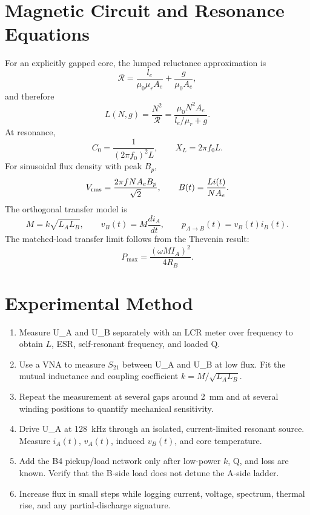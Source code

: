 \documentclass[11pt]{article}
\begin{document}
\section{Magnetic Circuit and Resonance Equations}
For an explicitly gapped core, the lumped reluctance approximation is
\begin{equation}
\mathcal{R} =
\frac{l_e}{\mu_0\mu_r A_e}+\frac{g}{\mu_0 A_e},
\end{equation}
and therefore
\begin{equation}
L(N,g)=\frac{N^2}{\mathcal{R}}
= \frac{\mu_0N^2A_e}{l_e/\mu_r+g}.
\end{equation}
At resonance,
\begin{equation}
C_0 = \frac{1}{(2\pi f_0)^2L},\qquad X_L=2\pi f_0L.
\end{equation}
For sinusoidal flux density with peak \(B_p\),
\begin{equation}
V_{\rm rms} = \frac{2\pi f N A_e B_p}{\sqrt{2}},
\qquad
B(t)=\frac{L i(t)}{N A_e}.
\end{equation}
The orthogonal transfer model is
\begin{equation}
M=k\sqrt{L_A L_B},
\qquad
v_B(t)=M\frac{di_A}{dt},
\qquad
p_{A\rightarrow B}(t)=v_B(t)i_B(t).
\end{equation}
The matched-load transfer limit follows from the Thevenin result:
\begin{equation}
P_{\max} = \frac{(\omega M I_A)^2}{4R_B}.
\end{equation}

\section{Experimental Method}
\begin{enumerate}
\item Measure U\_A and U\_B separately with an LCR meter over frequency to
obtain \(L\), ESR, self-resonant frequency, and loaded Q.
\item Use a VNA to measure \(S_21\) between U\_A and U\_B at low flux.  Fit
the mutual inductance and coupling coefficient \(k=M/\sqrt{L_AL_B}\).
\item Repeat the measurement at several gaps around \SI{2}{mm} and at
several winding positions to quantify mechanical sensitivity.
\item Drive U\_A at \SI{128}{kHz} through an isolated, current-limited
resonant source.  Measure \(i_A(t)\), \(v_A(t)\), induced \(v_B(t)\), and core
temperature.
\item Add the B4 pickup/load network only after low-power \(k\), Q, and loss are
known.  Verify that the B-side load does not detune the A-side ladder.
\item Increase flux in small steps while logging current, voltage, spectrum,
thermal rise, and any partial-discharge signature.
\end{enumerate}
\end{document}
